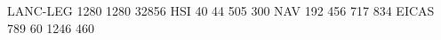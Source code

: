 LANC-LEG 1280 1280 32856
HSI       40   44  505  300
NAV      192  456  717  834
EICAS    789   60 1246  460

